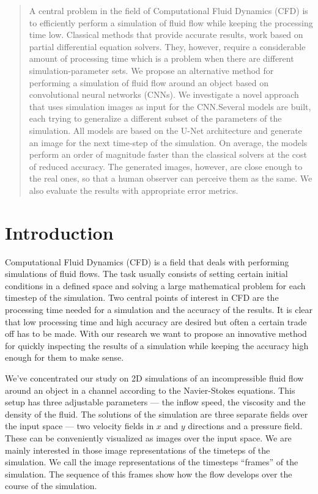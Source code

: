 \documentclass{llncs}
\begin{document}
\begin{abstract}
A central problem in the field of Computational Fluid Dynamics (CFD) is to efficiently perform a simulation of fluid flow while keeping the processing time low. Classical methods that provide accurate results, work based on partial differential equation solvers. They, however, require a considerable amount of processing time which is a problem when there are different simulation-parameter sets. We propose an alternative method for performing a simulation of fluid flow around an object based on convolutional neural networks (CNNs). We investigate a novel approach that uses simulation images as input for the CNN.\@ Several models are built, each trying to generalize a different subset of the parameters of the simulation. All models are based on the U-Net architecture and generate an image for the next time-step of the simulation. On average, the models perform an order of magnitude faster than the classical solvers at the cost of reduced accuracy. The generated images, however, are close enough to the real ones, so that a human observer can perceive them as the same. We also evaluate the results with appropriate error metrics.
\end{abstract}


\section{Introduction}\label{introduction}
Computational Fluid Dynamics (CFD) is a field that deals with performing simulations of fluid flows. The task usually consists of setting certain initial conditions in a defined space and solving a large mathematical problem for each timestep of the simulation. Two central points of interest in CFD are the processing time needed for a simulation and the accuracy of the results. It is clear that low processing time and high accuracy are desired but often a certain trade off has to be made. With our research we want to propose an innovative method for quickly inspecting the results of a simulation while keeping the accuracy high enough for them to make sense.

We've concentrated our study on 2D simulations of an incompressible fluid flow around an object in a channel according to the Navier-Stokes equations. This setup has three adjustable parameters --- the inflow speed, the viscosity and the density of the fluid. The solutions of the simulation are three separate fields over the input space --- two velocity fields in $x$ and $y$ directions and a pressure field. These can be conveniently visualized as images over the input space. We are mainly interested in those image representations of the timeteps of the simulation. We call the image representations of the timesteps ``frames'' of the simulation. The sequence of this frames show how the flow develops over the course of the simulation.
\end{document}
